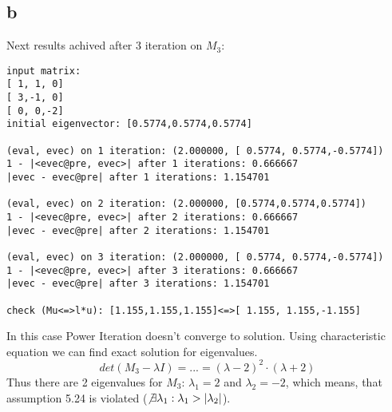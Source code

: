 \subsection*{b}
Next results achived after 3 iteration on $M_3$:
\begin{verbatim}
input matrix:
[ 1, 1, 0]
[ 3,-1, 0]
[ 0, 0,-2]
initial eigenvector: [0.5774,0.5774,0.5774]

(eval, evec) on 1 iteration: (2.000000, [ 0.5774, 0.5774,-0.5774])
1 - |<evec@pre, evec>| after 1 iterations: 0.666667
|evec - evec@pre| after 1 iterations: 1.154701

(eval, evec) on 2 iteration: (2.000000, [0.5774,0.5774,0.5774])
1 - |<evec@pre, evec>| after 2 iterations: 0.666667
|evec - evec@pre| after 2 iterations: 1.154701

(eval, evec) on 3 iteration: (2.000000, [ 0.5774, 0.5774,-0.5774])
1 - |<evec@pre, evec>| after 3 iterations: 0.666667
|evec - evec@pre| after 3 iterations: 1.154701

check (Mu<=>l*u): [1.155,1.155,1.155]<=>[ 1.155, 1.155,-1.155]
\end{verbatim}
In this case Power Iteration doesn't converge to solution. Using characteristic equation we can find exact solution for eigenvalues. 
\begin{equation}
	det(M_3 - \lambda I) = ... = (\lambda - 2)^2 \cdot (\lambda + 2)
\end{equation}
Thus there are 2 eigenvalues for $M_3$: $\lambda_1 = 2$ and $\lambda_2 = -2$, which means, that assumption 5.24 is violated ($\not \exists \lambda_1: \lambda_1 > |\lambda_2|$).

